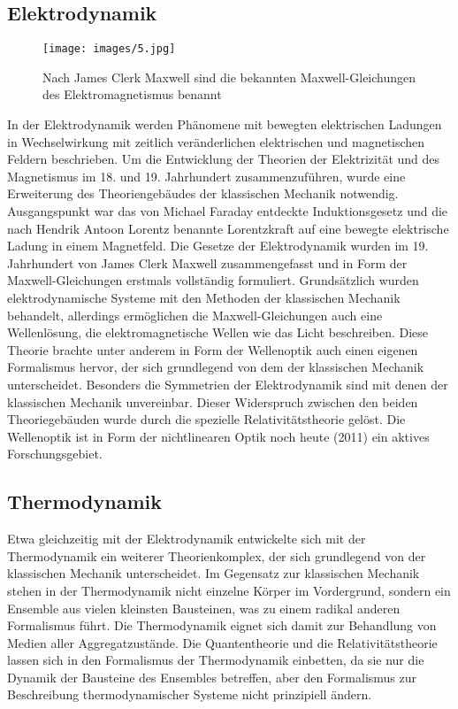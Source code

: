 \documentclass[titlepage, parkskip=full, twocolumn, landscape]{scrartcl}
\begin{document}
\subsection{Elektrodynamik}

\begin{figure}
	\centering
	\texttt{[image: images/5.jpg]}
	\caption{Nach James Clerk Maxwell sind die bekannten Maxwell-Gleichungen des Elektromagnetismus benannt}
\end{figure}

In der Elektrodynamik werden Phänomene mit bewegten elektrischen Ladungen in Wechselwirkung mit zeitlich veränderlichen elektrischen und magnetischen Feldern beschrieben. Um die Entwicklung der Theorien der Elektrizität und des Magnetismus im 18. und 19. Jahrhundert zusammenzuführen, wurde eine Erweiterung des Theoriengebäudes der klassischen Mechanik notwendig. Ausgangspunkt war das von Michael Faraday entdeckte Induktionsgesetz und die nach Hendrik Antoon Lorentz benannte Lorentzkraft auf eine bewegte elektrische Ladung in einem Magnetfeld. Die Gesetze der Elektrodynamik wurden im 19. Jahrhundert von James Clerk Maxwell zusammengefasst und in Form der Maxwell-Gleichungen erstmals vollständig formuliert. Grundsätzlich wurden elektrodynamische Systeme mit den Methoden der klassischen Mechanik behandelt, allerdings ermöglichen die Maxwell-Gleichungen auch eine Wellenlösung, die elektromagnetische Wellen wie das Licht beschreiben. Diese Theorie brachte unter anderem in Form der Wellenoptik auch einen eigenen Formalismus hervor, der sich grundlegend von dem der klassischen Mechanik unterscheidet. Besonders die Symmetrien der Elektrodynamik sind mit denen der klassischen Mechanik unvereinbar. Dieser Widerspruch zwischen den beiden Theoriegebäuden wurde durch die spezielle Relativitätstheorie gelöst. Die Wellenoptik ist in Form der nichtlinearen Optik noch heute (2011) ein aktives Forschungsgebiet.

\subsection{Thermodynamik}

Etwa gleichzeitig mit der Elektrodynamik entwickelte sich mit der Thermodynamik ein weiterer Theorienkomplex, der sich grundlegend von der klassischen Mechanik unterscheidet. Im Gegensatz zur klassischen Mechanik stehen in der Thermodynamik nicht einzelne Körper im Vordergrund, sondern ein Ensemble aus vielen kleinsten Bausteinen, was zu einem radikal anderen Formalismus führt. Die Thermodynamik eignet sich damit zur Behandlung von Medien aller Aggregatzustände. Die Quantentheorie und die Relativitätstheorie lassen sich in den Formalismus der Thermodynamik einbetten, da sie nur die Dynamik der Bausteine des Ensembles betreffen, aber den Formalismus zur Beschreibung thermodynamischer Systeme nicht prinzipiell ändern.
\end{document}
